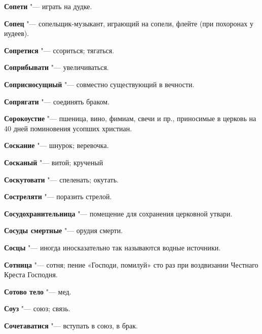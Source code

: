 \begin{mymulticols}{2}
\noindent\textbf{Сопети} "--- играть на дудке. 




\noindent\textbf{Сопец} "--- сопельщик-музыкант, играющий на сопели, флейте (при похоронах у иудеев). 




\noindent\textbf{Сопретися} "--- ссориться; тягаться. 




\noindent\textbf{Соприбывати} "--- увеличиваться. 




\noindent\textbf{Соприсносущный} "--- совместно существующий в вечности. 




\noindent\textbf{Сопрягати} "--- соединять браком. 




\noindent\textbf{Сорокоустие} "--- пшеница, вино, фимиам, свечи и пр., приносимые в церковь на 40 дней поминовения усопших христиан. 




\noindent\textbf{Соскание} "--- шнурок; веревочка. 




\noindent\textbf{Сосканый} "--- витой; крученый 




\noindent\textbf{Соскутовати} "--- спеленать; окутать. 




\noindent\textbf{Состреляти} "--- поразить стрелой. 




\noindent\textbf{Сосудохранительница} "--- помещение для сохранения церковной утвари. 




\noindent\textbf{Сосуды смертные} "--- орудия смерти. 




\noindent\textbf{Сосцы} "--- иногда иносказательно так называются водные источники. 




\noindent\textbf{Сотница} "--- сотня; пение «Господи, помилуй» сто раз при воздвизании Честнаго Креста Господня. 




\noindent\textbf{Сотово тело} "--- мед. 




\noindent\textbf{Соуз} "--- союз; связь. 




\noindent\textbf{Сочетаватися} "--- вступать в союз, в брак. 





\end{mymulticols}
